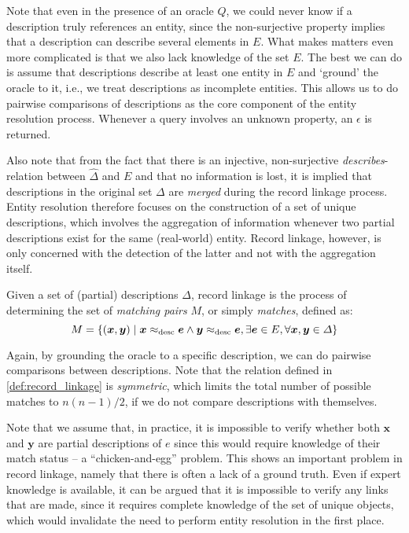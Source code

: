 Note that even in the presence of an oracle $Q$, we could never know if a description truly references an entity, since the non-surjective property implies that a description can describe several elements in $E$.
What makes matters even more complicated is that we also lack knowledge of the set $E$.
The best we can do is assume that descriptions describe at least one entity in $E$ and `ground' the oracle to it, i.e., we treat descriptions as incomplete entities.
This allows us to do pairwise comparisons of descriptions as the core component of the entity resolution process.
Whenever a query involves an unknown property, an $\epsilon$ is returned.

Also note that from the fact that there is an injective, non-surjective \emph{describes}-relation between $\hat{\Delta}$ and $E$ and that no information is lost, it is implied that descriptions in the original set $\Delta$ are \emph{merged} during the record linkage process.
Entity resolution therefore focuses on the construction of a set of unique descriptions, which involves the aggregation of information whenever two partial descriptions exist for the same (real-world) entity.
Record linkage, however, is only concerned with the detection of the latter and not with the aggregation itself.

\begin{definition}
    Given a set of (partial) descriptions $\Delta$, record linkage is the process of determining the set of \emph{matching pairs} $M$, or simply \emph{matches}, defined as:
    \begin{equation*}
        M = \left\{ (\bm{x}, \bm{y}) \mid \bm{x} \approx_\mathrm{desc} \bm{e} \wedge \bm{y} \approx_\mathrm{desc} \bm{e}, \exists \bm{e} \in E, \forall \bm{x}, \bm{y} \in \Delta \right\}
    \end{equation*}
    \label{def:record_linkage}
\end{definition}

Again, by grounding the oracle to a specific description, we can do pairwise comparisons between descriptions.
Note that the relation defined in \cref{def:record_linkage} is \emph{symmetric}, which limits the total number of possible matches to $n(n-1)/2$, if we do not compare descriptions with themselves.

Note that we assume that, in practice, it is impossible to verify whether both $\bm{x}$ and $\bm{y}$ are partial descriptions of $e$ since this would require knowledge of their match status -- a ``chicken-and-egg'' problem.
This shows an important problem in record linkage, namely that there is often a lack of a ground truth.
Even if expert knowledge is available, it can be argued that it is impossible to verify any links that are made, since it requires complete knowledge of the set of unique objects, which would invalidate the need to perform entity resolution in the first place.

